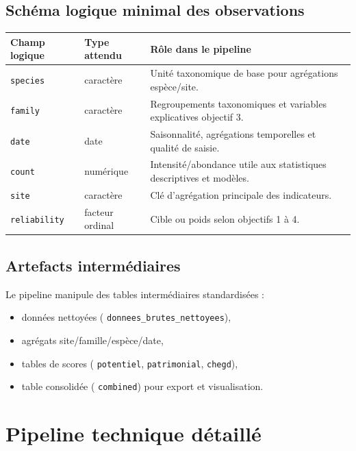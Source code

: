 \documentclass[11pt,a4paper]{article}
\begin{document}
\subsection{Schéma logique minimal des observations}
\begin{center}\begin{tabular}{p{}p{}p{}}
\toprule
\textbf{Champ logique} & \textbf{Type attendu} & \textbf{Rôle dans le pipeline} \\
\midrule
\texttt{species} & caractère & Unité taxonomique de base pour agrégations espèce/site. \\
\texttt{family} & caractère & Regroupements taxonomiques et variables explicatives objectif 3. \\
\texttt{date} & date & Saisonnalité, agrégations temporelles et qualité de saisie. \\
\texttt{count} & numérique & Intensité/abondance utile aux statistiques descriptives et modèles. \\
\texttt{site} & caractère & Clé d'agrégation principale des indicateurs. \\
\texttt{reliability} & facteur ordinal & Cible ou poids selon objectifs 1 à 4. \\
\bottomrule
\end{tabular}\end{center}

\subsection{Artefacts intermédiaires}
Le pipeline manipule des tables intermédiaires standardisées :
\begin{itemize}[leftmargin=1.2cm]
  \item données nettoyées (
  \texttt{donnees\_brutes\_nettoyees}),
  \item agrégats site/famille/espèce/date,
  \item tables de scores (
  \texttt{potentiel}, \texttt{patrimonial}, \texttt{chegd}),
  \item table consolidée (
  \texttt{combined}) pour export et visualisation.
\end{itemize}

\section{Pipeline technique détaillé}
\end{document}
